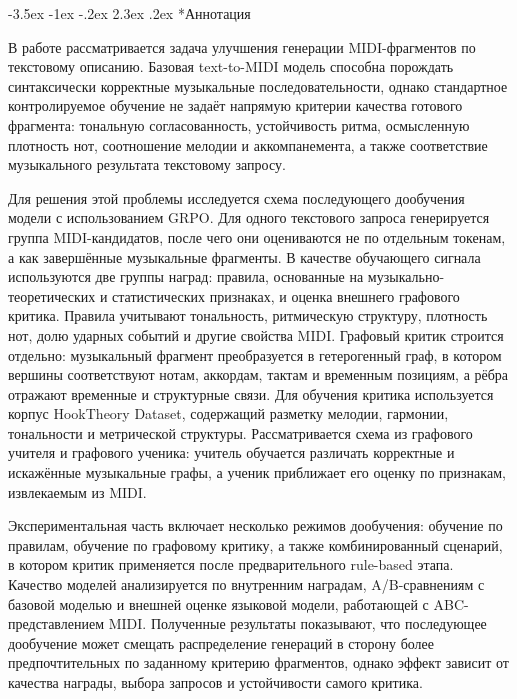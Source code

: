 \documentclass[a4paper,12pt]{extarticle}
\makeatletter
\renewcommand\section{\@startsection{section}{1}{\z@}%
  {-3.5ex \@plus -1ex \@minus -.2ex}%
  {2.3ex \@plus.2ex}%
  {\normalfont\Large\bfseries\Needspace{8\baselineskip}}}
\makeatother
\begin{document}

\newpage
\setcounter{page}{2}
\thispagestyle{empty}

{
    \hypersetup{linkcolor=black}
    \tableofcontents
}

\newpage


\section*{Аннотация}

В работе рассматривается задача улучшения генерации MIDI-фрагментов по текстовому описанию. Базовая text-to-MIDI модель способна порождать синтаксически корректные музыкальные последовательности, однако стандартное контролируемое обучение не задаёт напрямую критерии качества готового фрагмента: тональную согласованность, устойчивость ритма, осмысленную плотность нот, соотношение мелодии и аккомпанемента, а также соответствие музыкального результата текстовому запросу.

Для решения этой проблемы исследуется схема последующего дообучения модели с использованием GRPO. Для одного текстового запроса генерируется группа MIDI-кандидатов, после чего они оцениваются не по отдельным токенам, а как завершённые музыкальные фрагменты. В качестве обучающего сигнала используются две группы наград: правила, основанные на музыкально-теоретических и статистических признаках, и оценка внешнего графового критика. Правила учитывают тональность, ритмическую структуру, плотность нот, долю ударных событий и другие свойства MIDI. Графовый критик строится отдельно: музыкальный фрагмент преобразуется в гетерогенный граф, в котором вершины соответствуют нотам, аккордам, тактам и временным позициям, а рёбра отражают временные и структурные связи. Для обучения критика используется корпус HookTheory Dataset, содержащий разметку мелодии, гармонии, тональности и метрической структуры. Рассматривается схема из графового учителя и графового ученика: учитель обучается различать корректные и искажённые музыкальные графы, а ученик приближает его оценку по признакам, извлекаемым из MIDI.

Экспериментальная часть включает несколько режимов дообучения: обучение по правилам, обучение по графовому критику, а также комбинированный сценарий, в котором критик применяется после предварительного rule-based этапа. Качество моделей анализируется по внутренним наградам, A/B-сравнениям с базовой моделью и внешней оценке языковой модели, работающей с ABC-представлением MIDI. Полученные результаты показывают, что последующее дообучение может смещать распределение генераций в сторону более предпочтительных по заданному критерию фрагментов, однако эффект зависит от качества награды, выбора запросов и устойчивости самого критика.
\end{document}

